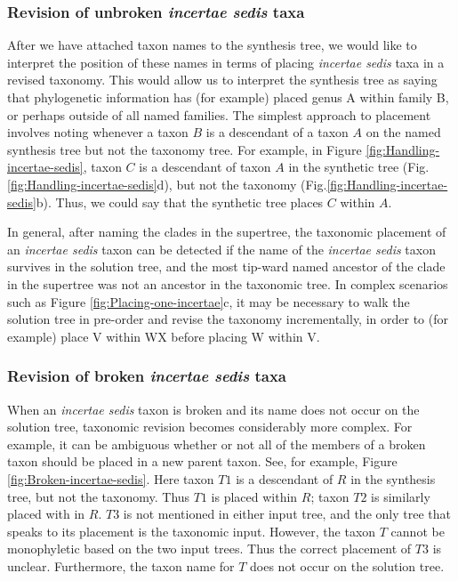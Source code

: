 \documentclass[english]{article}
\begin{document}
\subsubsection{Revision of unbroken \emph{incertae sedis} taxa}
After we have attached taxon names to the synthesis tree, we would
like to interpret the position of these names in terms of placing
\emph{incertae sedis }taxa in a revised taxonomy.
This would allow us
to interpret the synthesis tree as saying that phylogenetic
information has (for example) placed genus A within family B, or
perhaps outside of all named families.
The simplest approach to
placement involves noting whenever a taxon $B$ is a descendant of a
taxon $A$ on the named synthesis tree but not the taxonomy tree.
For
example, in Figure \ref{fig:Handling-incertae-sedis}, taxon $C$ is a
descendant of taxon $A$ in the synthetic tree 
(Fig.\ref{fig:Handling-incertae-sedis}d), but not the taxonomy 
(Fig.\ref{fig:Handling-incertae-sedis}b).
Thus, we could say that the synthetic tree places
$C$ within $A$.

In general, after naming the clades in the supertree, the
    taxonomic placement of an \emph{incertae sedis} taxon
    can be detected if the name of the \emph{incertae sedis} taxon
    survives in the solution tree, and the most tip-ward named
    ancestor of the clade in the supertree was not an ancestor in the
    taxonomic tree.  In complex scenarios such as Figure
    \ref{fig:Placing-one-incertae}c, it may be necessary to
    walk the solution tree in pre-order and revise the taxonomy
    incrementally, in order to (for example) place V within WX
    before placing W within V.
    
\subsubsection{Revision of broken \emph{incertae sedis} taxa}
When an \emph{incertae sedis} taxon is broken and its name does not
occur on the solution tree, taxonomic revision becomes considerably
more complex.  For example, it can be ambiguous whether or not all of
the members of a broken taxon should be placed in a new parent
taxon. See, for example, Figure \ref{fig:Broken-incertae-sedis}. Here
taxon $T1$ is a descendant of $R$ in the synthesis tree, but not the
taxonomy. Thus $T1$ is placed within $R$; taxon  $T2$ is similarly
placed with in $R$. $T3$ is not mentioned in either input tree, and
the  only tree that speaks to its placement is the taxonomic
input. However, the taxon $T$ cannot be monophyletic based on the two
input trees.  Thus the correct placement of $T3$ is unclear.
Furthermore, the taxon name for $T$ does not occur on the solution tree.
\end{document}

